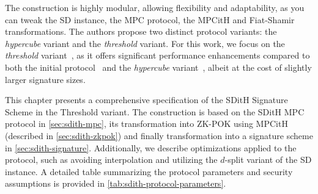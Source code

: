 \documentclass[11pt]{report}
\theoremstyle{definition}
\theoremstyle{plain}
\begin{document}
The construction is highly modular, allowing flexibility and adaptability, as you can tweak the SD instance, the MPC protocol, the MPCitH and Fiat-Shamir transformations. The authors propose two distinct protocol variants: the \textit{hypercube} variant and the \textit{threshold} variant. For this work, we focus on the \textit{threshold} variant~\cite{aguilarsyndrome11,feneuil2023threshold,feneuil2023threshold2}, as it offers significant performance enhancements compared to both the initial protocol~\cite{feneuil2022syndrome} and the \textit{hypercube} variant~\cite{aguilarsyndrome11,aguilar2023return,feneuil2023threshold2}, albeit at the cost of slightly larger signature sizes.

This chapter presents a comprehensive specification of the SDitH Signature Scheme in the Threshold variant. The construction is based on the SDitH MPC protocol in \autoref{sec:sdith-mpc}, its transformation into ZK-POK using MPCitH (described in \autoref{sec:sdith-zkpok}) and finally transformation into a signature scheme in \autoref{sec:sdith-signature}. Additionally, we describe optimizations applied to the protocol, such as avoiding interpolation and utilizing the $d$-split variant of the SD instance. A detailed table summarizing the protocol parameters and security assumptions is provided in \autoref{tab:sdith-protocol-parameters}.
\end{document}
